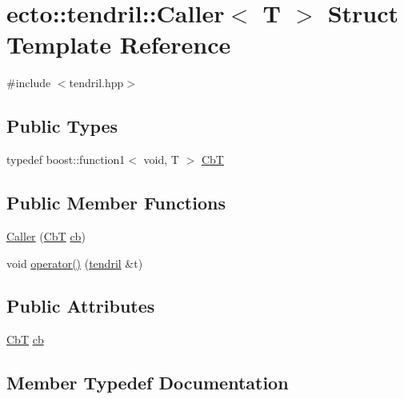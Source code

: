 \hypertarget{structecto_1_1tendril_1_1Caller}{}\section{ecto\+:\+:tendril\+:\+:Caller$<$ T $>$ Struct Template Reference}
\label{structecto_1_1tendril_1_1Caller}


{\ttfamily \#include $<$tendril.\+hpp$>$}

\subsection*{Public Types}
\begin{DoxyCompactItemize}
\item 
typedef boost\+::function1$<$ void, T $>$ \hyperlink{structecto_1_1tendril_1_1Caller_a846333ac5c22cfb6eafb1c2240c0c623}{CbT}
\end{DoxyCompactItemize}
\subsection*{Public Member Functions}
\begin{DoxyCompactItemize}
\item 
\hyperlink{structecto_1_1tendril_1_1Caller_a84b71a5526ff59dcbd6cb7a102f8d9db}{Caller} (\hyperlink{structecto_1_1tendril_1_1Caller_a846333ac5c22cfb6eafb1c2240c0c623}{CbT} \hyperlink{structecto_1_1tendril_1_1Caller_afecdbc09ca504c16292a6365ab1cd950}{cb})
\item 
void \hyperlink{structecto_1_1tendril_1_1Caller_a19099e68a2059823575e71f45b2c0b20}{operator()} (\hyperlink{classecto_1_1tendril}{tendril} \&t)
\end{DoxyCompactItemize}
\subsection*{Public Attributes}
\begin{DoxyCompactItemize}
\item 
\hyperlink{structecto_1_1tendril_1_1Caller_a846333ac5c22cfb6eafb1c2240c0c623}{CbT} \hyperlink{structecto_1_1tendril_1_1Caller_afecdbc09ca504c16292a6365ab1cd950}{cb}
\end{DoxyCompactItemize}


\subsection{Member Typedef Documentation}
